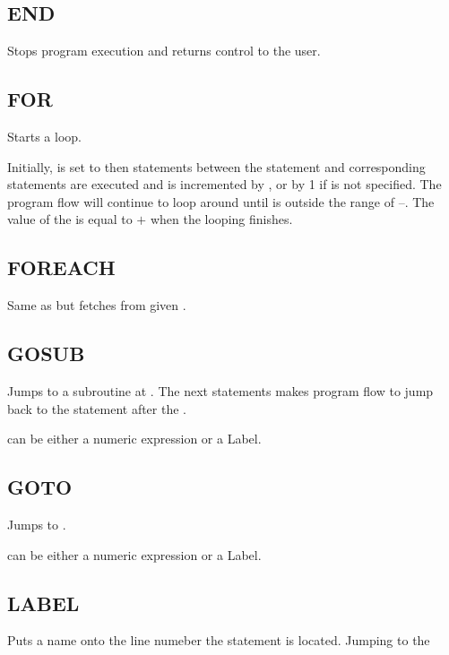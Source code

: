     \subsection{END}
        \par
        Stops program execution and returns control to the user.
    \subsection{FOR}
        \par
        Starts a  loop.\par
        Initially,  is set to  then statements between the  statement and corresponding  statements are executed and  is incremented by , or by 1 if  is not specified. The program flow will continue to loop around until  is outside the range of --. The value of the  is equal to $+$ when the looping finishes.
    \subsection{FOREACH}
        \par
        Same as  but fetches  from given .
    \subsection{GOSUB}
        \par
        Jumps to a subroutine at . The next  statements makes program flow to jump back to the statement after the .\par
         can be either a numeric expression or a Label.
    \subsection{GOTO}
        \par
        Jumps to .\par
         can be either a numeric expression or a Label.
    \subsection{LABEL}
        \par
        Puts a name onto the line numeber the statement is located. Jumping to the 
